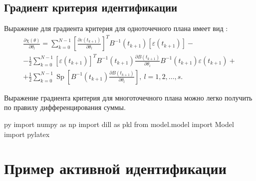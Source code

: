 \documentclass[a4paper,14pt]{extarticle}
\DeclareMathOperator{\Sp}{Sp}
\newcommand{\eps}{\varepsilon}
\begin{document}
\subsection{Градиент критерия идентификации}

Выражение для градиента критерия для одноточечного плана имеет вид \cite{mono}:
\begin{equation*}
\begin{split}
  \frac{\partial \chi(\theta)}{\partial \theta_l} = \sum\limits_{k=0}^{N-1}
  \left[ \frac{\partial \eps(t_{k+1})}{\partial \theta_l} \right]^T
  B^{-1}(t_{k+1}) \left[ \eps(t_{k+1}) \right] - \\
  - \frac{1}{2}
  \sum\limits_{k=0}^{N-1} \left[ \eps(t_{k+1}) \right]^T B^{-1}(t_{k+1})
  \frac{\partial B(t_{k+1})}{\partial \theta_i} B^{-1}(t_{k+1}) \eps(t_{k+1}) +
  \\ + 
  \frac{1}{2} \sum\limits_{k=0}^{N-1} \Sp \left[ B^{-1}(t_{k+1})
  \frac{\partial B(t_{k+1})}{\partial \theta_l} \right],\ l = 1, 2, \ldots, s.
\end{split}
\end{equation*}

Выражение градиента критерия для многоточечного плана можно легко получить по
правилу дифференцирования суммы.

\begin{pythontexcustomcode}{py}
import numpy as np
import dill as pkl
from model.model import Model
import pylatex
\end{pythontexcustomcode}

\section{Пример активной идентификации}
\end{document}

